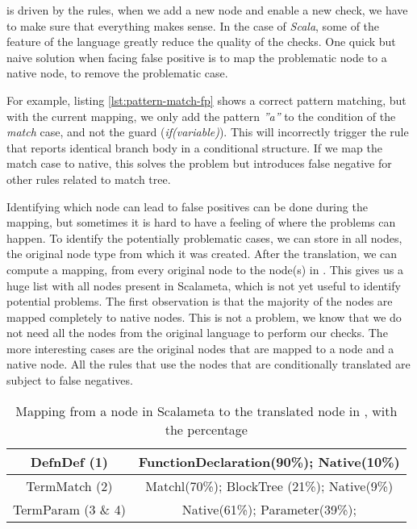 \slang{} is driven by the rules, when we add a new node and enable a new check, we have to make sure that everything makes sense. 
In the case of \emph{Scala}, some of the feature of the language greatly reduce the quality of the checks.
One quick but naive solution when facing false positive is to map the problematic node to a native node, to remove the problematic case.



For example, listing \ref{lst:pattern-match-fp} shows a correct pattern matching, but with the current mapping, we only add the pattern \emph{”a”} to the condition of the \emph{match} case, and not the guard (\emph{if(variable)}). 
This will incorrectly trigger the rule that reports identical branch body in a conditional structure. 
If we map the match case to native, this solves the problem but introduces false negative for other rules related to match tree.

Identifying which node can lead to false positives can be done during the mapping, but sometimes it is hard to have a feeling of where the problems can happen. 
To identify the potentially problematic cases, we can store in all nodes, the original node type from which it was created. 
After the translation, we can compute a mapping, from every original node to the node(s) in \slang{}. 
This gives us a huge list with all nodes present in Scalameta, which is not yet useful to identify potential problems. 
The first observation is that the majority of the nodes are mapped completely to native nodes. 
This is not a problem, we know that we do not need all the nodes from the original language to perform our checks.
The more interesting cases are the original nodes that are mapped to a \slang{} node and a native node. 
All the rules that use the nodes that are conditionally translated are subject to false negatives.

\begin{table}[h]
	\centering
	\caption{Mapping from a node in Scalameta to the translated node in \slang{}, with the percentage}
	\label{table:interesting_mapping}
	\begin{tabular}{|c|c|}
		\hline
		DefnDef (1) &  FunctionDeclaration(90\%); Native(10\%) \\ \hline
		TermMatch (2) &  Matchl(70\%); BlockTree (21\%); Native(9\%) \\ \hline
		TermParam (3 \& 4) & Native(61\%); Parameter(39\%); \\ \hline
	\end{tabular}
\end{table}

